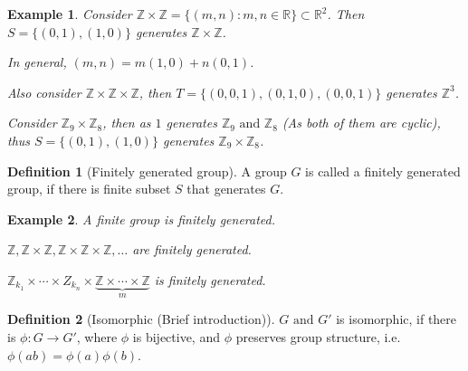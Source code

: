 \documentclass{article}
\theoremstyle{MyNonumberplain}
\theoremstyle{break}
\newcommand{\infixand}{\text{ and }}
\theoremstyle{break}
\newtheorem{example}{Example}[section]
\theoremstyle{break}
\theoremstyle{definition}
\theoremstyle{break}
\newtheorem{definition}{Definition}[section]
\begin{document}
\begin{expbox}
    \begin{example}
        Consider $\mathbb{Z} \times \mathbb{Z}= \{ (m, n) : m, n \in \mathbb{R} \}
        \subset \mathbb{R}^2$. Then $S = \{ (0, 1), (1, 0) \}$ generates $\mathbb{Z}
        \times \mathbb{Z}$.\bigskip

        In general, $(m, n) = m (1, 0) + n (0, 1)$.\bigskip

        Also consider $\mathbb{Z} \times \mathbb{Z} \times \mathbb{Z}$, then $T = \{
        (0, 0, 1), (0, 1, 0), (0, 0, 1) \}$ generates $\mathbb{Z}^3$.\bigskip

        Consider $\mathbb{Z}_9 \times \mathbb{Z}_8$, then as $1$ generates
        $\mathbb{Z}_9 \infixand \mathbb{Z}_8$ (As both of them are cyclic), thus $S =
        \{ (0, 1), (1, 0) \}$ generates $\mathbb{Z}_9 \times \mathbb{Z}_8$.
    \end{example}
\end{expbox}

\begin{defbox}
    \begin{definition}[Finitely generated group]
        A group $G$ is called a finitely generated group, if there is finite subset $S$ that generates $G$.
    \end{definition}
\end{defbox}

\begin{expbox}
    \begin{example}
        A finite group is finitely generated.\bigskip

        $\mathbb{Z}, \mathbb{Z} \times \mathbb{Z}, \mathbb{Z} \times \mathbb{Z} \times
        \mathbb{Z}, \ldots$ are finitely generated.\bigskip

        $\mathbb{Z}_{k_1} \times \cdots \times Z_{k_n} \times
        \underset{m}{\underbrace{\mathbb{Z} \times \cdots \times \mathbb{Z}}}$ is
        finitely generated. 
    \end{example}
\end{expbox}

\begin{defbox}
    \begin{definition}[Isomorphic (Brief introduction)]
        $G \infixand G'$ is isomorphic, if there is $\phi : G \rightarrow G'$, where
        $\phi$ is bijective, and $\phi$ preserves group structure, i.e. $\phi (a b) =
        \phi (a) \phi (b)$.
    \end{definition}
\end{defbox}
\end{document}
